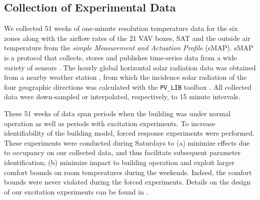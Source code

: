 
\subsection{Collection of Experimental Data}\label{sec:exp_data}
We collected 51 weeks of one-minute resolution temperature data for the six zones along with the airflow rates of the 21 VAV boxes, SAT and the outside air temperature from the \textit{simple Measurement and Actuation Profile} (sMAP). sMAP is a protocol that collects, stores and publishes time-series data from a wide variety of sensors \cite{:ac, Dawson-Haggerty:2012aa}. The hourly global horizontal solar radiation data was obtained from a nearby weather station \cite{SolarRad}, from which the incidence solar radiation of the four geographic directions was calculated with the \texttt{PV\_LIB} toolbox \cite{:ab}. All collected data were down-sampled or interpolated, respectively, to 15 minute intervals. 

These 51 weeks of data span periods when the building was under normal operation as well as periods with excitation experiments. To increase identifiability of the building model, forced response experiments were performed. These experiments were conducted during Saturdays to (a) minimize effects due to occupancy on our collected data, and thus facilitate subsequent parameter identification; (b) minimize impact to building operation and exploit larger comfort bounds on room temperatures during the weekends. Indeed, the comfort bounds were never violated during the forced experiments. Details on the design of our excitation experiments can be found in \cite{Qie}.



